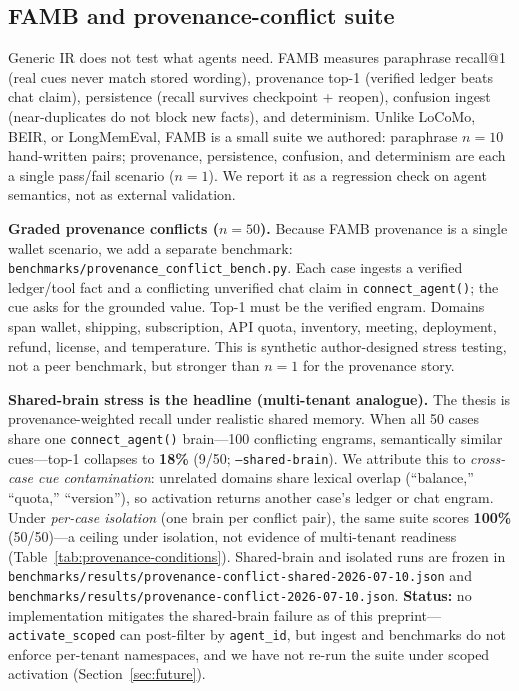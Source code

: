 \documentclass[11pt]{article}
\begin{document}
\subsection{FAMB and provenance-conflict suite}
Generic IR does not test what agents need. FAMB measures paraphrase recall@1
(real cues never match stored wording), provenance top-1 (verified ledger beats
chat claim), persistence (recall survives checkpoint + reopen), confusion ingest
(near-duplicates do not block new facts), and determinism. Unlike LoCoMo, BEIR,
or LongMemEval, FAMB is a small suite we authored: paraphrase $n{=}10$ hand-written
pairs; provenance, persistence, confusion, and determinism are each a single
pass/fail scenario ($n{=}1$). We report it as a regression check on agent semantics,
not as external validation.

\textbf{Graded provenance conflicts ($n{=}50$).} Because FAMB provenance is a
single wallet scenario, we add a separate benchmark:
\texttt{benchmarks/provenance\_conflict\_bench.py}. Each case ingests a verified
ledger/tool fact and a conflicting unverified chat claim in
\texttt{connect\_agent()}; the cue asks for the grounded value. Top-1 must be the
verified engram. Domains span wallet, shipping, subscription, API quota,
inventory, meeting, deployment, refund, license, and temperature. This is
synthetic author-designed stress testing, not a peer benchmark, but stronger than
$n{=}1$ for the provenance story.

\textbf{Shared-brain stress is the headline (multi-tenant analogue).} The thesis is
provenance-weighted recall under realistic shared memory. When all 50 cases share
one \texttt{connect\_agent()} brain---100 conflicting engrams, semantically similar
cues---top-1 collapses to \textbf{18\%} (9/50; \texttt{--shared-brain}). We
attribute this to \emph{cross-case cue contamination}: unrelated domains share
lexical overlap (``balance,'' ``quota,'' ``version''), so activation returns
another case's ledger or chat engram. Under \emph{per-case isolation} (one brain
per conflict pair), the same suite scores \textbf{100\%} (50/50)---a ceiling under
isolation, not evidence of multi-tenant readiness
(Table~\ref{tab:provenance-conditions}). Shared-brain and isolated runs are frozen in
\texttt{benchmarks/results/provenance-conflict-shared-2026-07-10.json} and
\texttt{benchmarks/results/provenance-conflict-2026-07-10.json}.
\textbf{Status:} no implementation
mitigates the shared-brain failure as of this preprint---\texttt{activate\_scoped}
can post-filter by \texttt{agent\_id}, but ingest and benchmarks do not enforce
per-tenant namespaces, and we have not re-run the suite under scoped activation
(Section~\ref{sec:future}).
\end{document}
